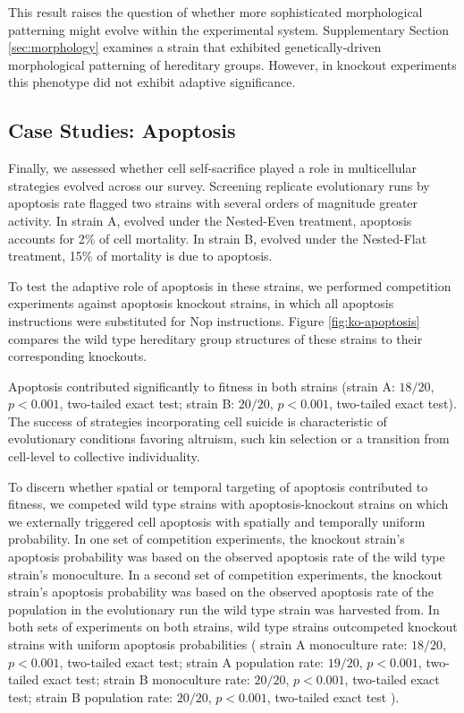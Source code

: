 This result raises the question of whether more sophisticated morphological patterning might evolve within the experimental system.
Supplementary Section \ref{sec:morphology} examines a strain that exhibited genetically-driven morphological patterning of hereditary groups.
However, in knockout experiments this phenotype did not exhibit adaptive significance.

\subsection{Case Studies: Apoptosis} \label{sec:apoptosis}



Finally, we assessed whether cell self-sacrifice played a role in multicellular strategies evolved across our survey.
Screening replicate evolutionary runs by apoptosis rate flagged two strains with several orders of magnitude greater activity.
In strain A, evolved under the Nested-Even treatment, apoptosis accounts for 2\% of cell mortality.
In strain B, evolved under the Nested-Flat treatment, 15\% of mortality is due to apoptosis.

To test the adaptive role of apoptosis in these strains, we performed competition experiments against apoptosis knockout strains, in which all apoptosis instructions were substituted for Nop instructions.
Figure \ref{fig:ko-apoptosis} compares the wild type hereditary group structures of these strains to their corresponding knockouts.

Apoptosis contributed significantly to fitness in both strains (strain A: $18/20$, $p < 0.001$, two-tailed exact test; strain B: $20/20$, $p < 0.001$, two-tailed exact test).
The success of strategies incorporating cell suicide is characteristic of evolutionary conditions favoring altruism, such kin selection or a transition from cell-level to collective individuality.

To discern whether spatial or temporal targeting of apoptosis contributed to fitness, we competed wild type strains with apoptosis-knockout strains on which we externally triggered cell apoptosis with spatially and temporally uniform probability.
In one set of competition experiments, the knockout strain's apoptosis probability was based on the observed apoptosis rate of the wild type strain's monoculture.
In a second set of competition experiments, the knockout strain's apoptosis probability was based on the observed apoptosis rate of the population in the evolutionary run the wild type strain was harvested from.
In both sets of experiments on both strains, wild type strains outcompeted knockout strains with uniform apoptosis probabilities
(%
strain A \@ monoculture rate: $18/20$, $p < 0.001$, two-tailed exact test;
strain A \@ population rate: $19/20$, $p < 0.001$, two-tailed exact test;
strain B \@ monoculture rate: $20/20$, $p < 0.001$, two-tailed exact test;
strain B \@ population rate: $20/20$, $p < 0.001$, two-tailed exact test%
). %
